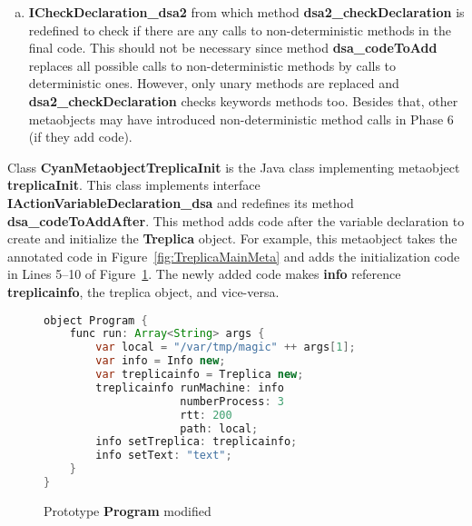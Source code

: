 \documentclass[preprint,review]{elsarticle}
\newcommand{\srcstyle}[1]{\ttfamily\textbf{#1}\rmfamily}
\begin{document}
\begin{enumerate}[(a)]
\item \srcstyle{ICheckDeclaration\_dsa2} from which method \srcstyle{dsa2\_checkDeclaration} is redefined to check if there are any calls to non-deterministic methods in the final code. This should not be necessary since method \srcstyle{dsa\_codeToAdd} replaces all possible calls to non-deterministic methods by calls to deterministic ones. However, only unary methods are replaced and \srcstyle{dsa2\_checkDeclaration} checks keywords methods too. Besides that, other metaobjects may have introduced non-deterministic method calls in Phase 6 (if they add code).



\end{enumerate}

Class   \srcstyle{CyanMetaobjectTreplicaInit}   is  the   Java   class
implementing    metaobject   \srcstyle{treplicaInit}.     This   class
implements  interface  \srcstyle{IActionVariableDeclaration\_dsa}  and
redefines its method  \srcstyle{dsa\_codeToAddAfter}. This method adds
code  after the  variable  declaration to  create  and initialize  the
\srcstyle{Treplica} object.   For example,  this metaobject  takes the
annotated  code  in  Figure~\ref{fig:TreplicaMainMeta}  and  adds  the
initialization  code in  Lines  5--10 of  Figure~\ref{fig:InitChange}.
The    newly    added    code    makes    \srcstyle{info}    reference
\srcstyle{treplicainfo}, the treplica object, and vice-versa.


\begin{figure}[h]
\centering
\begin{lstlisting}[language=Java]
object Program {
    func run: Array<String> args {
        var local = "/var/tmp/magic" ++ args[1];
        var info = Info new;
        var treplicainfo = Treplica new;
        treplicainfo runMachine: info
                     numberProcess: 3
                     rtt: 200
                     path: local;
        info setTreplica: treplicainfo;
        info setText: "text";
    }
}
\end{lstlisting}
\caption{Prototype \srcstyle{Program} modified}
\label{fig:InitChange}
\end{figure}


\begin{comment}
Metaobjects are somewhat related to annotations of Java \cite{Gosling:2014:JLS:2636997} and other Java-based languages such as Groovy \cite{groovy2017}. Unlike Java, metaobjects can change the source code in which they are used.

\end{comment}
\end{document}
